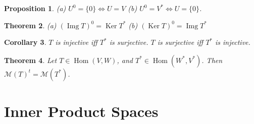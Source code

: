 \documentclass[12pt]{amsart}
\renewcommand{\ker}{\Ker}
\DeclareMathOperator{\Ker}{Ker}
\DeclareMathOperator{\Hom}{Hom}
\DeclareMathOperator{\img}{Img}
\newcommand{\calM}[0]{\mathcal{M}}
\newtheorem{theorem}{Theorem}[section]
\newtheorem{proposition}[theorem]{Proposition}
\newtheorem{corollary}[theorem]{Corollary}
\theoremstyle{remark}
\numberwithin{equation}{section}
\begin{document}
	\begin{proposition}
		\textup{(a)} $U^0=\{0\}\iff U=V$ \textup{(b)} $U^0=V^*\iff U=\{0\}$.
	\end{proposition}
	\begin{theorem}
		\textup{(a)} $(\img T)^0=\ker T^*$ \textup{(b)} $(\ker T)^0=\img T^*$
	\end{theorem}
	\begin{corollary}
		$T$ is injective iff $T^*$ is surjective. $T$ is surjective iff $T^*$ is injective.
	\end{corollary}
	\begin{theorem}
		Let $T\in \Hom(V,W)$, and $T^*\in\Hom(W^*,V^*)$. Then $\calM(T)^t=\calM(T^*)$.
	\end{theorem}
	\section{Inner Product Spaces}
	
	
	
\end{document}

